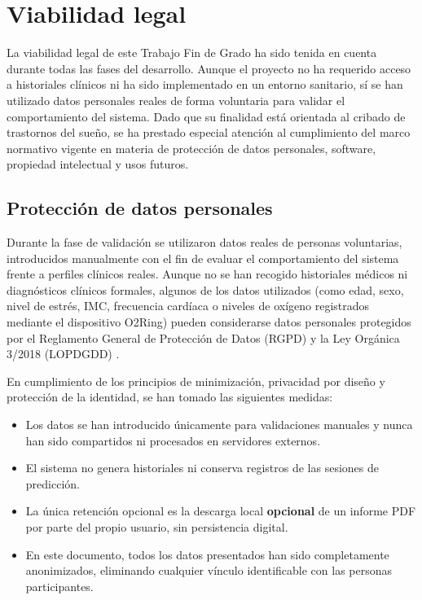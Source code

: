 \section{Viabilidad legal}

La viabilidad legal de este Trabajo Fin de Grado ha sido tenida en cuenta durante todas las fases del desarrollo. Aunque el proyecto no ha requerido acceso a historiales clínicos ni ha sido implementado en un entorno sanitario, sí se han utilizado datos personales reales de forma voluntaria para validar el comportamiento del sistema. Dado que su finalidad está orientada al cribado de trastornos del sueño, se ha prestado especial atención al cumplimiento del marco normativo vigente en materia de protección de datos personales, software, propiedad intelectual y usos futuros.

\subsection{Protección de datos personales}

Durante la fase de validación se utilizaron datos reales de personas voluntarias, introducidos manualmente con el fin de evaluar el comportamiento del sistema frente a perfiles clínicos reales. Aunque no se han recogido historiales médicos ni diagnósticos clínicos formales, algunos de los datos utilizados (como edad, sexo, nivel de estrés, IMC, frecuencia cardíaca o niveles de oxígeno registrados mediante el dispositivo O2Ring) pueden considerarse datos personales protegidos por el Reglamento General de Protección de Datos (RGPD) \cite{rgpd2016} y la Ley Orgánica 3/2018 (LOPDGDD) \cite{lopdgdd2018}.


En cumplimiento de los principios de minimización, privacidad por diseño y protección de la identidad, se han tomado las siguientes medidas:

\begin{itemize}
  \item Los datos se han introducido únicamente para validaciones manuales y nunca han sido compartidos ni procesados en servidores externos.
  \item El sistema no genera historiales ni conserva registros de las sesiones de predicción.
  \item La única retención opcional es la descarga local \textbf{opcional} de un informe PDF por parte del propio usuario, sin persistencia digital.
  \item En este documento, todos los datos presentados han sido completamente anonimizados, eliminando cualquier vínculo identificable con las personas participantes.
\end{itemize}

